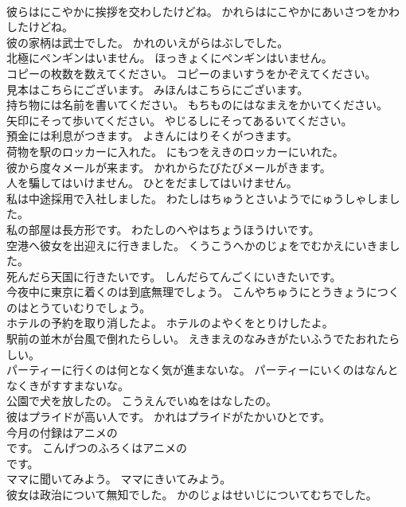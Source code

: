 \documentclass[8pt]{extreport}
\begin{document}
\begin{CJK}{UTF8}{min}
\\	彼らはにこやかに挨拶を交わしたけどね。	かれらはにこやかにあいさつをかわしたけどね。 
\\	彼の家柄は武士でした。	かれのいえがらはぶしでした。 
\\	北極にペンギンはいません。	ほっきょくにペンギンはいません。 
\\	コピーの枚数を数えてください。	コピーのまいすうをかぞえてください。 
\\	見本はこちらにございます。	みほんはこちらにございます。 
\\	持ち物には名前を書いてください。	もちものにはなまえをかいてください。 
\\	矢印にそって歩いてください。	やじるしにそってあるいてください。 
\\	預金には利息がつきます。	よきんにはりそくがつきます。 
\\	荷物を駅のロッカーに入れた。	にもつをえきのロッカーにいれた。 
\\	彼から度々メールが来ます。	かれからたびたびメールがきます。 
\\	人を騙してはいけません。	ひとをだましてはいけません。 
\\	私は中途採用で入社しました。	わたしはちゅうとさいようでにゅうしゃしました。 
\\	私の部屋は長方形です。	わたしのへやはちょうほうけいです。 
\\	空港へ彼女を出迎えに行きました。	くうこうへかのじょをでむかえにいきました。 
\\	死んだら天国に行きたいです。	しんだらてんごくにいきたいです。 
\\	今夜中に東京に着くのは到底無理でしょう。	こんやちゅうにとうきょうにつくのはとうていむりでしょう。 
\\	ホテルの予約を取り消したよ。	ホテルのよやくをとりけしたよ。 
\\	駅前の並木が台風で倒れたらしい。	えきまえのなみきがたいふうでたおれたらしい。 
\\	パーティーに行くのは何となく気が進まないな。	パーティーにいくのはなんとなくきがすすまないな。 
\\	公園で犬を放したの。	こうえんでいぬをはなしたの。 
\\	彼はプライドが高い人です。	かれはプライドがたかいひとです。 
\\	今月の付録はアニメの
\\	です。	こんげつのふろくはアニメの
\\	です。 
\\	ママに聞いてみよう。	ママにきいてみよう。 
\\	彼女は政治について無知でした。	かのじょはせいじについてむちでした。 

\end{CJK}
\end{document}

